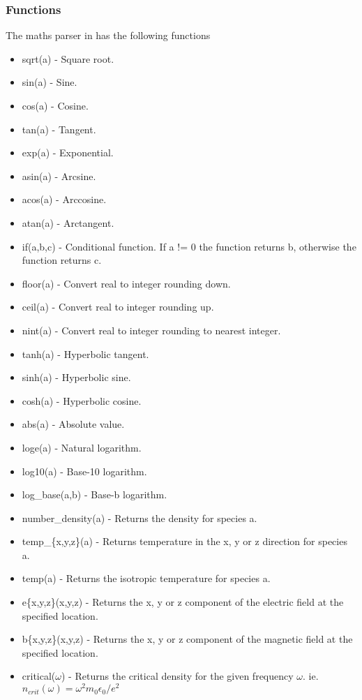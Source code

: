 \documentclass[12pt,a4paper]{article}
\newcommand{\EPOCH}{{\color{warwickdark}\fontfamily{phv}\selectfont{EPOCH}}}
\begin{document}
\subsubsection{Functions}
\label{sec:functions}
The maths parser in {\EPOCH} has the following functions
\begin{itemize}
\item sqrt(a) - Square root.
\item sin(a) - Sine.
\item cos(a) - Cosine.
\item tan(a) - Tangent.
\item exp(a) - Exponential.
\item asin(a) - Arcsine.
\item acos(a) - Arccosine.
\item atan(a) - Arctangent.
\item if(a,b,c) - Conditional function. If a != 0 the function returns b,
  otherwise the function returns c.
\item floor(a) - Convert real to integer rounding down.
\item ceil(a) - Convert real to integer rounding up.
\item nint(a) - Convert real to integer rounding to nearest integer.
\item tanh(a) - Hyperbolic tangent.
\item sinh(a) - Hyperbolic sine.
\item cosh(a) - Hyperbolic cosine.
\item abs(a) - Absolute value.
\item loge(a) - Natural logarithm.
\item log10(a) - Base-10 logarithm.
\item log\_base(a,b) - Base-b logarithm.
\item number\_density(a) - Returns the density for species a.
\item temp\_\{x,y,z\}(a) - Returns temperature in the x, y or z direction for species a.
\item temp(a) - Returns the isotropic temperature for species a.
\item e\{x,y,z\}(x,y,z) - Returns the x, y or z component of the electric
    field at the specified location.
\item b\{x,y,z\}(x,y,z) - Returns the x, y or z component of the magnetic
    field at the specified location.
\item critical($\omega$) - Returns the critical density for the given
    frequency $\omega$. ie. $n_{crit}(\omega) = \omega^2 m_0 \epsilon_0 / e^2$

\end{itemize}
\end{document}
